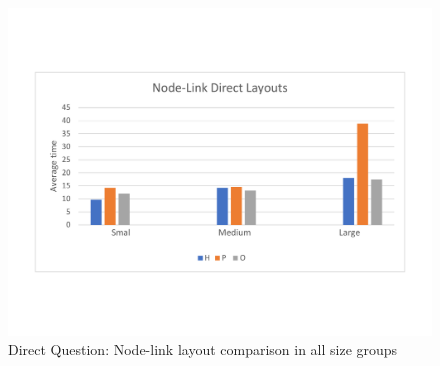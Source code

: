 \documentclass{l4proj}
\begin{document}
\begin{figure}[H]
\centering
\includegraphics[width=15cm]{nodelinkdirectlayouts.pdf}
\caption{Direct Question: Node-link layout comparison in all size groups}
\label{largenodevsmartrixdirect}
\end{figure}
\end{document}
